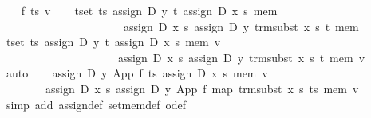 \begin{isabellebody}
\isamarkupfalse%
\isanewline
\ \ \isamarkupfalse%
\ f\ ts\ v\isanewline
\ \ \isamarkupfalse%
\ {}{}t{}set\ ts{}\ assign\ D\ y\ t\ {}assign\ D\ x\ s\ mem{}\ {}\isanewline
\ \ \ \ \ \ \ \ \ \ \ \ \ \ \ \ \ \ \ \ \ \ assign\ D\ x\ s\ {}assign\ D\ y\ {}trm{}subst\ x\ s\ t{}\ mem{}{}\isanewline
\ \ \isamarkupfalse%
\ {}{}t{}set\ ts{}\ assign\ D\ y\ t\ {}assign\ D\ x\ s\ mem{}\ v\ {}\isanewline
\ \ \ \ \ \ \ \ \ \ \ \ \ \ \ \ \ \ \ \ \ assign\ D\ x\ s\ {}assign\ D\ y\ {}trm{}subst\ x\ s\ t{}\ mem{}\ v{}\isanewline
\ \ \ \ \isamarkupfalse%
\ auto\isanewline
\ \ \isamarkupfalse%
\ {}assign\ D\ y\ {}App\ f\ ts{}\ {}assign\ D\ x\ s\ mem{}\ v\ {}\isanewline
\ \ \ \ \ \ \ \ assign\ D\ x\ s\ {}assign\ D\ y\ {}App\ f\ {}map\ {}trm{}subst\ x\ s{}\ ts{}{}\ mem{}\ v{}\isanewline
\ \ \ \ \isamarkupfalse%
\ {}simp\ add{}\ assign{}def\ set{}mem{}def\ o{}def{}\isanewline

\end{isabellebody}
